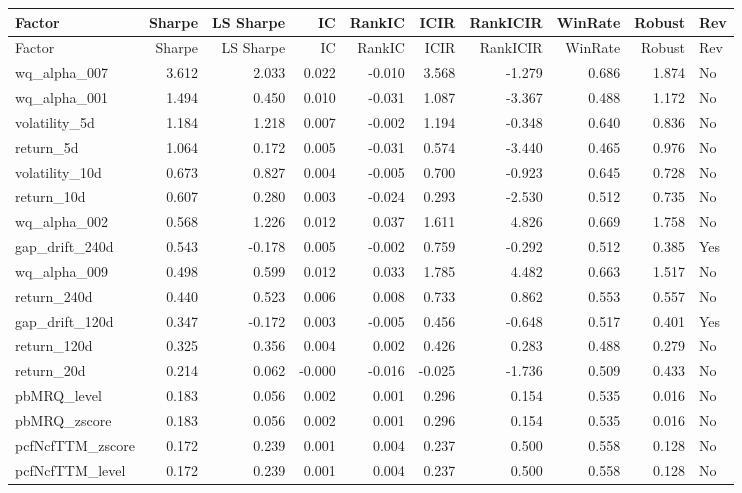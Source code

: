 \scriptsize
\setlength{\tabcolsep}{2pt}
\begin{longtable}{lrrrrrrrrl}
\toprule
Factor & Sharpe & LS Sharpe & IC & RankIC & ICIR & RankICIR & WinRate & Robust & Rev \\
\midrule
\endfirsthead
\toprule
Factor & Sharpe & LS Sharpe & IC & RankIC & ICIR & RankICIR & WinRate & Robust & Rev \\
\midrule
\endhead
wq\_alpha\_007 & 3.612 & 2.033 & 0.022 & -0.010 & 3.568 & -1.279 & 0.686 & 1.874 & No \\
wq\_alpha\_001 & 1.494 & 0.450 & 0.010 & -0.031 & 1.087 & -3.367 & 0.488 & 1.172 & No \\
volatility\_5d & 1.184 & 1.218 & 0.007 & -0.002 & 1.194 & -0.348 & 0.640 & 0.836 & No \\
return\_5d & 1.064 & 0.172 & 0.005 & -0.031 & 0.574 & -3.440 & 0.465 & 0.976 & No \\
volatility\_10d & 0.673 & 0.827 & 0.004 & -0.005 & 0.700 & -0.923 & 0.645 & 0.728 & No \\
return\_10d & 0.607 & 0.280 & 0.003 & -0.024 & 0.293 & -2.530 & 0.512 & 0.735 & No \\
wq\_alpha\_002 & 0.568 & 1.226 & 0.012 & 0.037 & 1.611 & 4.826 & 0.669 & 1.758 & No \\
gap\_drift\_240d & 0.543 & -0.178 & 0.005 & -0.002 & 0.759 & -0.292 & 0.512 & 0.385 & Yes \\
wq\_alpha\_009 & 0.498 & 0.599 & 0.012 & 0.033 & 1.785 & 4.482 & 0.663 & 1.517 & No \\
return\_240d & 0.440 & 0.523 & 0.006 & 0.008 & 0.733 & 0.862 & 0.553 & 0.557 & No \\
gap\_drift\_120d & 0.347 & -0.172 & 0.003 & -0.005 & 0.456 & -0.648 & 0.517 & 0.401 & Yes \\
return\_120d & 0.325 & 0.356 & 0.004 & 0.002 & 0.426 & 0.283 & 0.488 & 0.279 & No \\
return\_20d & 0.214 & 0.062 & -0.000 & -0.016 & -0.025 & -1.736 & 0.509 & 0.433 & No \\
pbMRQ\_level & 0.183 & 0.056 & 0.002 & 0.001 & 0.296 & 0.154 & 0.535 & 0.016 & No \\
pbMRQ\_zscore & 0.183 & 0.056 & 0.002 & 0.001 & 0.296 & 0.154 & 0.535 & 0.016 & No \\
pcfNcfTTM\_zscore & 0.172 & 0.239 & 0.001 & 0.004 & 0.237 & 0.500 & 0.558 & 0.128 & No \\
pcfNcfTTM\_level & 0.172 & 0.239 & 0.001 & 0.004 & 0.237 & 0.500 & 0.558 & 0.128 & No \\

\end{longtable}
